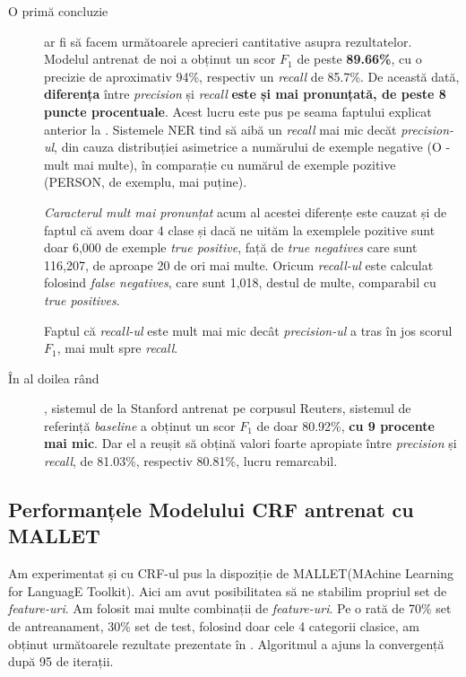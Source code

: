 \begin{description}

\item[O primă concluzie] ar fi să facem următoarele aprecieri cantitative asupra rezultatelor. Modelul antrenat de noi a obținut un scor \textbf{$F_1$} de peste \textbf{89.66\%}, cu o precizie de aproximativ 94\%, respectiv un \textit{recall} de 85.7\%.  De această dată, \textbf{diferența} între \textit{precision} și \textit{recall}\textbf{ este și mai pronunțată, de peste 8 puncte procentuale}. Acest lucru este pus pe seama faptului explicat anterior la . Sistemele NER tind să aibă un \textit{recall} mai mic decăt \textit{precision-ul}, din cauza distribuției asimetrice a numărului de exemple negative (O - mult mai multe), în comparație cu numărul de exemple pozitive (PERSON, de exemplu, mai puține). 

\textit{Caracterul mult mai pronunțat} acum al acestei diferențe este cauzat și de faptul că avem doar 4 clase și dacă ne uităm la exemplele pozitive sunt doar 6,000 de exemple \textit{true positive}, față de \textit{true negatives} care sunt 116,207, de aproape 20 de ori mai multe. Oricum \textit{recall-ul} este calculat folosind \textit{false negatives}, care sunt 1,018, destul de multe, comparabil cu \textit{true positives}.

Faptul că \textit{recall-ul} este mult mai mic decât \textit{precision-ul} a tras în jos scorul $F_1$, mai mult spre \textit{recall}.

\item[În al doilea rând], sistemul de la Stanford antrenat pe corpusul Reuters, sistemul de referință \textit{baseline} a obținut un scor $F_1$ de doar 80.92\%, \textbf{cu 9 procente mai mic}. Dar el a reușit să obțină  valori foarte apropiate între \textit{precision} și \textit{recall}, de 81.03\%, respectiv 80.81\%, lucru remarcabil.

\end{description}

\subsection{Performanțele Modelului CRF antrenat cu MALLET}

Am experimentat și cu CRF-ul pus la dispoziție de MALLET(MAchine Learning for LanguagE Toolkit). Aici am avut posibilitatea să ne stabilim propriul set de \textit{feature-uri}. Am folosit mai multe combinații de \textit{feature-uri}. Pe o rată de 70\% set de antreanament, 30\% set de test, folosind doar cele 4 categorii clasice, am obținut următoarele rezultate prezentate în . Algoritmul a ajuns la convergență după 95 de iterații.

